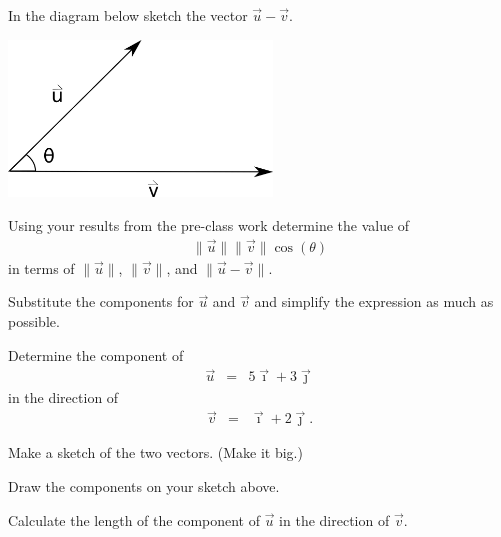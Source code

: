 \begin{problem}
\item  In the diagram below sketch the vector $\vec{u}-\vec{v}$.

  \includegraphics[width=7cm]{ink/week11/dotProduct}

\item Using your results from the pre-class work determine the value
  of
  \begin{eqnarray*}
    \| \vec{u} \| \| \vec{v} \| \cos(\theta)
  \end{eqnarray*}
  in terms of $\|\vec{u}\|$, $\|\vec{v}\|$, and $\|\vec{u}-\vec{v}\|$.

  \vfill

\item Substitute the components for $\vec{u}$ and $\vec{v}$ and
  simplify the expression as much as possible.

  \vfill

\clearpage

\item Determine the component of
  \begin{eqnarray*}
    \vec{u} & = & 5 \vec{\imath} + 3 \vec{\jmath}
  \end{eqnarray*}
  in the direction of
  \begin{eqnarray*}
    \vec{v} & = & \vec{\imath} + 2 \vec{\jmath}.
  \end{eqnarray*}

  \begin{subproblem}
  \item Make a sketch of the two vectors. (Make it big.)
    \vfill
  \item Draw the components on your sketch above.
  \item Calculate the length of the component of $\vec{u}$ in the
    direction of $\vec{v}$.
    \vfill
  \end{subproblem}

\end{problem}


\postClass


